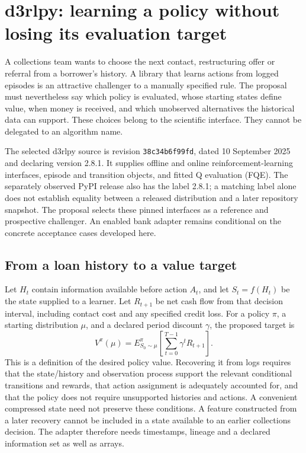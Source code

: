 \section{d3rlpy: learning a policy without losing its evaluation target}
\label{exec15:d3rlpy-contract}

A collections team wants to choose the next contact, restructuring offer or
referral from a borrower's history. A library that learns actions from logged
episodes is an attractive challenger to a manually specified rule. The
proposal must nevertheless say which policy is evaluated, whose starting
states define value, when money is received, and which unobserved alternatives
the historical data can support. These choices belong to the scientific
interface. They cannot be delegated to an algorithm name.

The selected d3rlpy source is revision \texttt{38c34b6f99fd}, dated
10 September 2025 and declaring version 2.8.1. It supplies offline and online
reinforcement-learning interfaces, episode and transition objects, and fitted
Q evaluation (FQE). The separately observed PyPI release also has the label
2.8.1; a matching label alone does not establish equality between a released
distribution and a later repository snapshot. The proposal selects these
pinned interfaces as a reference and prospective challenger. An enabled bank
adapter remains conditional on the concrete acceptance cases developed here.
\citep{exec15_d3rlpy_package,exec15_d3rlpy_value,exec15_d3rlpy_contract}

\subsection{From a loan history to a value target}

Let \(H_t\) contain information available before action \(A_t\), and let
\(S_t=f(H_t)\) be the state supplied to a learner. Let \(R_{t+1}\) be net
cash flow from that decision interval, including contact cost and any
specified credit loss. For a policy \(\pi\), a starting distribution \(\mu\),
and a declared period discount \(\gamma\), the proposed target is
\[
 V^{\pi}(\mu)=E_{S_0\sim\mu}^{\pi}
       \left[\sum_{t=0}^{T-1}\gamma^t R_{t+1}\right].
\]
This is a definition of the desired policy value. Recovering it from logs
requires that the state/history and observation process support the relevant
conditional transitions and rewards, that action assignment is adequately
accounted for, and that the policy does not require unsupported histories and
actions. A convenient compressed state need not preserve these conditions.
A feature constructed from a later recovery cannot be included in a state
available to an earlier collections decision. The adapter therefore needs
timestamps, lineage and a declared information set as well as arrays.
\citep{exec15_d3rlpy_contract}

